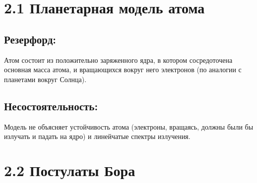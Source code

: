 \documentclass[a4paper,12pt]{article}
\begin{document}
\begin{center}
\end{center}

\vspace{-2.5em}









\section*{2.1 Планетарная модель атома}
\vspace{-9pt}
\subsection*{Резерфорд:}
\vspace{-3pt}
Атом состоит из положительно заряженного ядра, в котором сосредоточена основная масса атома, и вращающихся вокруг него электронов (по аналогии с планетами вокруг Солнца).

\vspace{-9pt}
\subsection*{Несостоятельность:}
\vspace{-3pt}
Модель не объясняет устойчивость атома (электроны, вращаясь, должны были бы излучать и падать на ядро) и линейчатые спектры излучения.


\section*{2.2 Постулаты Бора}
\vspace{-9pt}
\end{document}
